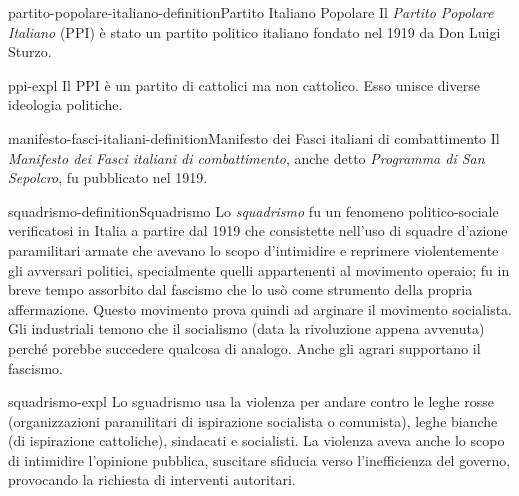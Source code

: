 \documentclass[preview]{standalone}
\begin{document}
\begin{snippetdefinition}{partito-popolare-italiano-definition}{Partito Italiano Popolare}
    Il \textit{Partito Popolare Italiano} (PPI) è stato un partito politico italiano
    fondato nel 1919 da Don Luigi Sturzo. 
\end{snippetdefinition}

\begin{snippet}{ppi-expl}
    Il PPI è un partito di cattolici ma non cattolico.
    Esso unisce diverse ideologia politiche.
\end{snippet}



\begin{snippetdefinition}{manifesto-fasci-italiani-definition}{Manifesto dei Fasci italiani di combattimento}
    Il \textit{Manifesto dei Fasci italiani di combattimento},
    anche detto \textit{Programma di San Sepolcro},
    fu pubblicato nel 1919.
\end{snippetdefinition}

\begin{snippetdefinition}{squadrismo-definition}{Squadrismo}
    Lo \textit{squadrismo} fu un fenomeno politico-sociale verificatosi in Italia
    a partire dal 1919 che consistette nell'uso di squadre d'azione paramilitari armate
    che avevano lo scopo d'intimidire e reprimere violentemente gli
    avversari politici, specialmente quelli appartenenti al movimento
    operaio; fu in breve tempo assorbito dal fascismo che lo usò come
    strumento della propria affermazione.
    Questo movimento prova quindi ad arginare il movimento socialista.
    Gli industriali temono che il socialismo (data la rivoluzione appena avvenuta)
    perché porebbe succedere qualcosa di analogo.
    Anche gli agrari supportano il fascismo.
\end{snippetdefinition}

\begin{snippet}{squadrismo-expl}
    Lo sguadrismo usa la violenza per andare contro le leghe rosse
    (organizzazioni paramilitari di ispirazione socialista o comunista),
    leghe bianche (di ispirazione cattoliche), sindacati e socialisti.
    La violenza aveva anche lo scopo di intimidire l'opinione pubblica, suscitare
    sfiducia verso l'inefficienza del governo, provocando la richiesta di interventi autoritari.
\end{snippet}
\end{document}
